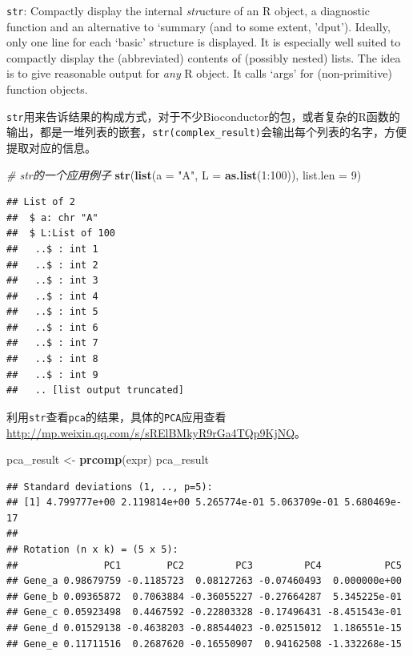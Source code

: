 \documentclass[]{article}
\newenvironment{Shaded}{\begin{snugshade}}{\end{snugshade}}
\newcommand{\KeywordTok}[1]{\textcolor[rgb]{0.13,0.29,0.53}{\textbf{{#1}}}}
\newcommand{\DataTypeTok}[1]{\textcolor[rgb]{0.13,0.29,0.53}{{#1}}}
\newcommand{\DecValTok}[1]{\textcolor[rgb]{0.00,0.00,0.81}{{#1}}}
\newcommand{\StringTok}[1]{\textcolor[rgb]{0.31,0.60,0.02}{{#1}}}
\newcommand{\CommentTok}[1]{\textcolor[rgb]{0.56,0.35,0.01}{\textit{{#1}}}}
\newcommand{\NormalTok}[1]{{#1}}
\numberwithin{figure}{section}
\numberwithin{table}{section}
\theoremstyle{definition}
\theoremstyle{definition}
\theoremstyle{definition}
\theoremstyle{remark}
\begin{document}
\texttt{str}: Compactly display the internal \emph{str}ucture of an R
object, a diagnostic function and an alternative to `summary (and to
some extent, 'dput'). Ideally, only one line for each `basic' structure
is displayed. It is especially well suited to compactly display the
(abbreviated) contents of (possibly nested) lists. The idea is to give
reasonable output for \emph{any} R object. It calls `args' for
(non-primitive) function objects.

\texttt{str}用来告诉结果的构成方式，对于不少Bioconductor的包，或者复杂的R函数的输出，都是一堆列表的嵌套，\texttt{str(complex\_result)}会输出每个列表的名字，方便提取对应的信息。

\begin{Shaded}
\begin{Highlighting}[]
\CommentTok{# str的一个应用例子}
\KeywordTok{str}\NormalTok{(}\KeywordTok{list}\NormalTok{(}\DataTypeTok{a =} \StringTok{"A"}\NormalTok{, }\DataTypeTok{L =} \KeywordTok{as.list}\NormalTok{(}\DecValTok{1}\NormalTok{:}\DecValTok{100}\NormalTok{)), }\DataTypeTok{list.len =} \DecValTok{9}\NormalTok{)}
\end{Highlighting}
\end{Shaded}

\begin{verbatim}
## List of 2
##  $ a: chr "A"
##  $ L:List of 100
##   ..$ : int 1
##   ..$ : int 2
##   ..$ : int 3
##   ..$ : int 4
##   ..$ : int 5
##   ..$ : int 6
##   ..$ : int 7
##   ..$ : int 8
##   ..$ : int 9
##   .. [list output truncated]
\end{verbatim}

利用\texttt{str}查看\texttt{pca}的结果，具体的\texttt{PCA}应用查看
\url{http://mp.weixin.qq.com/s/sRElBMkyR9rGa4TQp9KjNQ}。

\begin{Shaded}
\begin{Highlighting}[]
\NormalTok{pca_result <-}\StringTok{ }\KeywordTok{prcomp}\NormalTok{(expr)}
\NormalTok{pca_result}
\end{Highlighting}
\end{Shaded}

\begin{verbatim}
## Standard deviations (1, .., p=5):
## [1] 4.799777e+00 2.119814e+00 5.265774e-01 5.063709e-01 5.680469e-17
## 
## Rotation (n x k) = (5 x 5):
##               PC1        PC2         PC3         PC4           PC5
## Gene_a 0.98679759 -0.1185723  0.08127263 -0.07460493  0.000000e+00
## Gene_b 0.09365872  0.7063884 -0.36055227 -0.27664287  5.345225e-01
## Gene_c 0.05923498  0.4467592 -0.22803328 -0.17496431 -8.451543e-01
## Gene_d 0.01529138 -0.4638203 -0.88544023 -0.02515012  1.186551e-15
## Gene_e 0.11711516  0.2687620 -0.16550907  0.94162508 -1.332268e-15
\end{verbatim}
\end{document}
